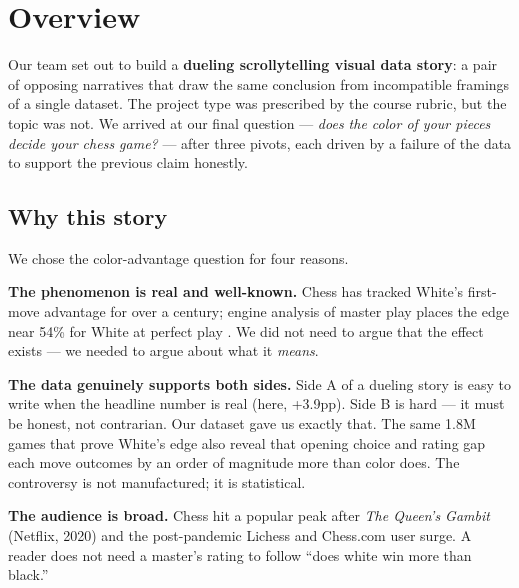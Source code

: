 \documentclass[sigconf,nonacm,natbib=false]{acmart}
\begin{document}

\maketitle

\section{Overview}

Our team set out to build a \textbf{dueling scrollytelling visual
data story}: a pair of opposing narratives that draw the same
conclusion from incompatible framings of a single dataset. The
project type was prescribed by the course rubric, but the topic was
not. We arrived at our final question --- \emph{does the color of
your pieces decide your chess game?} --- after three pivots, each
driven by a failure of the data to support the previous claim
honestly.

\subsection{Why this story}

We chose the color-advantage question for four reasons.

\textbf{The phenomenon is real and well-known.} Chess has tracked
White's first-move advantage for over a century; engine analysis
of master play places the edge near 54\% for White at perfect play
\cite{chessbase-firstmove}. We did not need to argue that the
effect exists --- we needed to argue about what it \emph{means}.

\textbf{The data genuinely supports both sides.} Side A of a
dueling story is easy to write when the headline number is real
(here, +3.9pp). Side B is hard --- it must be honest, not
contrarian. Our dataset gave us exactly that. The same 1.8M games
that prove White's edge also reveal that opening choice and rating
gap each move outcomes by an order of magnitude more than color
does. The controversy is not manufactured; it is statistical.

\textbf{The audience is broad.} Chess hit a popular peak after
\emph{The Queen's Gambit} (Netflix, 2020) and the post-pandemic
Lichess and Chess.com user surge. A reader does not need a master's
rating to follow ``does white win more than black.''
\end{document}
